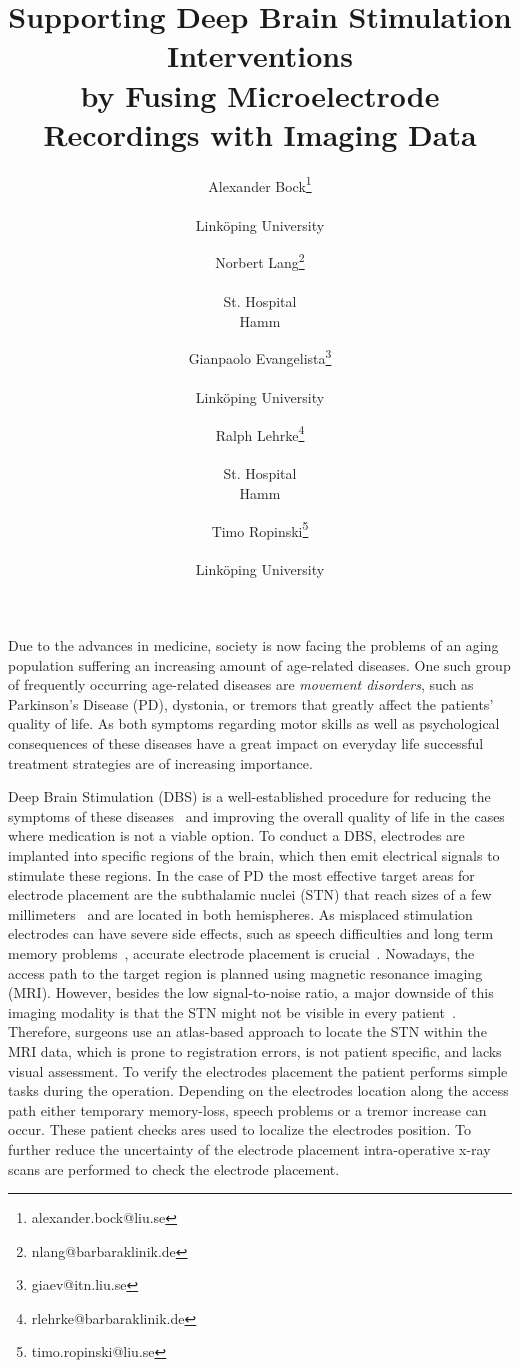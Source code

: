 \documentclass[review]{vgtc}                 %
\title{Supporting Deep Brain Stimulation Interventions \\ by Fusing Microelectrode Recordings with Imaging Data}
\author{Alexander Bock\thanks{alexander.bock@liu.se} \\ %
	\parbox{1in}{\scriptsize \centering Link\"oping University}
\and Norbert Lang\thanks{nlang@barbaraklinik.de} \\ %
	\parbox{1in}{\scriptsize \centering St. Hospital \\ Hamm}
\and Gianpaolo Evangelista\thanks{giaev@itn.liu.se} \\ %
	\parbox{1in}{\scriptsize \centering Link\"oping University}
\and Ralph Lehrke\thanks{rlehrke@barbaraklinik.de} \\ %
	\parbox{1in}{\scriptsize \centering St. Hospital \\ Hamm}
\and Timo Ropinski\thanks{timo.ropinski@liu.se} \\ %
	\parbox{1in}{\scriptsize \centering Link\"oping University}
}
\begin{document}
\label{sec:introduction}

\maketitle

Due to the advances in medicine, society is now facing the problems of an aging population suffering an increasing amount of age-related diseases. One such group of frequently occurring age-related diseases are \emph{movement disorders}, such as Parkinson's Disease (PD), dystonia, or tremors that greatly affect the patients' quality of life. As both symptoms regarding motor skills as well as psychological consequences of these diseases have a great impact on everyday life successful treatment strategies are of increasing importance.

Deep Brain Stimulation (DBS) is a well-established procedure for reducing the symptoms of these diseases~\cite{Lindberg2002,Benabid2009} and improving the overall quality of life in the cases where medication is not a viable option. To conduct a DBS, electrodes are implanted into specific regions of the brain, which then emit electrical signals to stimulate these regions. In the case of PD the most effective target areas for electrode placement are the subthalamic nuclei (STN) that reach sizes of a few millimeters~\cite{Richter2004} and are located in both hemispheres. As misplaced stimulation electrodes can have severe side effects, such as speech difficulties and long term memory problems~\cite{Astrom2010}, accurate electrode placement is crucial~\cite{Rodriguez-Oroz2005}. Nowadays, the access path to the target region is planned using magnetic resonance imaging (MRI). However, besides the low signal-to-noise ratio, a major downside of this imaging modality is that the STN might not be visible in every patient~\cite{Starr2002}. Therefore, surgeons use an atlas-based approach to locate the STN within the MRI data, which is prone to registration errors, is not patient specific, and lacks visual assessment. To verify the electrodes placement the patient performs simple tasks during the operation. Depending on the electrodes location along the access path either temporary memory-loss, speech problems or a tremor increase can occur. These patient checks ares used to localize the electrodes position. To further reduce the uncertainty of the electrode placement intra-operative x-ray scans are performed to check the electrode placement.
%
%
\end{document}
